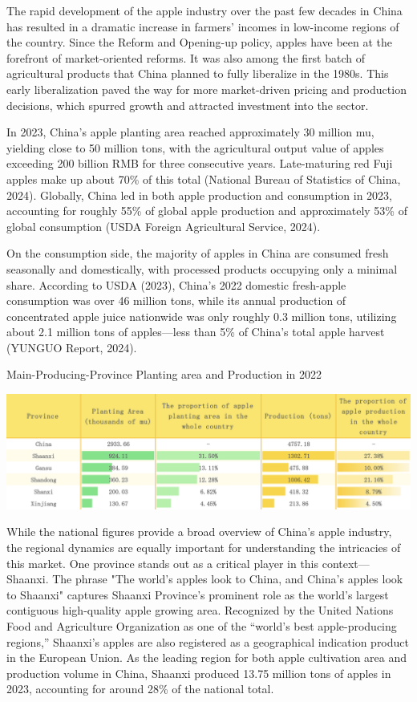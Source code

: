 The rapid development of the apple industry over the past few decades in China has resulted in a dramatic increase in farmers’ incomes in low-income regions of the country. Since the Reform and Opening-up policy, apples have been at the forefront of market-oriented reforms. It was also among the first batch of agricultural products that China planned to fully liberalize in the 1980s. This early liberalization paved the way for more market-driven pricing and production decisions, which spurred growth and attracted investment into the sector.

In 2023, China’s apple planting area reached approximately 30 million mu, yielding close to 50 million tons, with the agricultural output value of apples exceeding 200 billion RMB for three consecutive years. Late-maturing red Fuji apples make up about 70\% of this total (National Bureau of Statistics of China, 2024). Globally, China led in both apple production and consumption in 2023, accounting for roughly 55\% of global apple production and approximately 53\% of global consumption (USDA Foreign Agricultural Service, 2024).

On the consumption side, the majority of apples in China are consumed fresh seasonally and domestically, with processed products occupying only a minimal share. According to USDA (2023), China's 2022 domestic fresh-apple consumption was over 46 million tons, while its annual production of concentrated apple juice nationwide was only roughly 0.3 million tons, utilizing about 2.1 million tons of apples—less than 5\% of China’s total apple harvest (YUNGUO Report, 2024).

\begin{table}[hpt]
    \centering
        \caption{Main-Producing-Province Planting area and Production in 2022}
    \includegraphics[width=\linewidth]{tables/production_provinces_table.png}
    \label{tab: production provinces}
\end{table}


While the national figures provide a broad overview of China’s apple industry, the regional dynamics are equally important for understanding the intricacies of this market. One province stands out as a critical player in this context—Shaanxi. The phrase "The world's apples look to China, and China's apples look to Shaanxi" captures Shaanxi Province's prominent role as the world's largest contiguous high-quality apple growing area. Recognized by the United Nations Food and Agriculture Organization as one of the “world’s best apple-producing regions,” Shaanxi’s apples are also registered as a geographical indication product in the European Union. As the leading region for both apple cultivation area and production volume in China, Shaanxi produced 13.75 million tons of apples in 2023, accounting for around 28\% of the national total.

